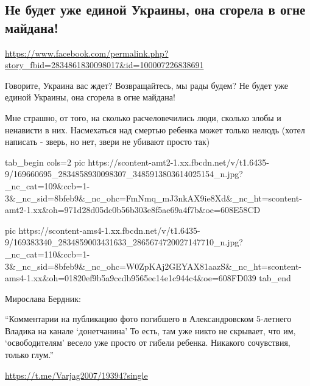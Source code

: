  
 
 
 
 

\subsection{Не будет уже единой Украины, она сгорела в огне майдана!}
\label{sec:05_04_2021.fb.andreev_vladimir.1.donbass_vojna_rebenok_smert_glumlenie}
\url{https://www.facebook.com/permalink.php?story_fbid=2834861830098017&id=100007226838691}

Говорите, Украина вас ждет? Возвращайтесь, мы рады будем? Не будет уже единой Украины, она сгорела в огне майдана!

Мне страшно, от того, на сколько расчеловечились люди, сколько злобы и
ненависти в них. Насмехаться над смертью ребенка может только нелюдь (хотел
написать - зверь, но нет, звери не убивают просто так)

\ifcmt
  tab_begin cols=2
    pic https://scontent-amt2-1.xx.fbcdn.net/v/t1.6435-9/169660695_2834858930098307_3485913803614025154_n.jpg?_nc_cat=109&ccb=1-3&_nc_sid=8bfeb9&_nc_ohc=FmNmq_mJ3nkAX9ie8Xd&_nc_ht=scontent-amt2-1.xx&oh=971d28d05dc0b56b303e8f5ae69a4f7b&oe=608E58CD

    pic https://scontent-ams4-1.xx.fbcdn.net/v/t1.6435-9/169383340_2834859003431633_2865674720027147710_n.jpg?_nc_cat=110&ccb=1-3&_nc_sid=8bfeb9&_nc_ohc=W0ZpKAj2GEYAX81aazS&_nc_ht=scontent-ams4-1.xx&oh=01820ef9b5a9ccdb9565ec14e1c944c4&oe=608FD039
  tab_end
\fi

Мирослава Бердник:

\enquote{Комментарии на публикацию фото погибшего в Александровском 5-летнего Владика на канале \enquote{донетчанина} 
То есть, там уже никто не скрывает, что им, \enquote{освободителям} 
весело уже просто от гибели ребенка. Никакого сочувствия, только глум.}

\url{https://t.me/Varjag2007/19394?single}
